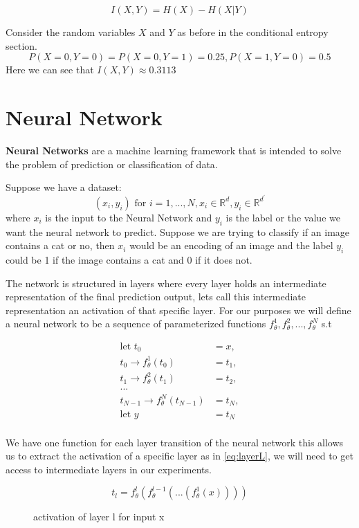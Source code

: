 \begin{equation}
  I(X, Y) = H(X) - H(X|Y)
\label{eq:miEntropy}
\end{equation}

Consider the random variables $X$ and $Y$ as before in the conditional entropy
section. 
$$P(X=0,Y=0) = P(X=0,Y=1) = 0.25, P(X=1,Y=0) = 0.5$$
Here we can see that $I(X,Y) \approx 0.3113$

\section{Neural Network}

\textbf{Neural Networks} are a machine learning framework that is intended to
solve the problem of prediction or classification of data. 

Suppose we have a dataset:
$$ (x_i, y_i) \text{ for } i = 1,...,N, x_i \in \mathbb{R}^d, y_i \in \mathbb{R}^{d^\prime}$$ 
where $x_i$ is the input to the Neural Network and $y_i$ is the label or the
value we want the neural network to predict. Suppose we are trying to classify
if an image contains a cat or no, then $x_i$ would be an encoding of an image
and the label $y_i$ could be 1 if the image contains a cat and 0 if it does not.

The network is structured in layers where every layer holds an intermediate
representation of the final prediction output, lets call this intermediate
representation an activation of that specific layer. For our purposes we will
define a neural network to be a sequence of parameterized functions
$f_{\theta}^1, f_{\theta}^2, ...  ,f_{\theta}^N$ s.t

\begin{align*}
  \text{let } t_0 &= x, \\
    t_0 \rightarrow f_{\theta}^1(t_0) &= t_1,\\
    t_1 \rightarrow f_{\theta}^2(t_1) &= t_2,\\
    ...\\
    t_{N-1} \rightarrow f_{\theta}^N(t_{N-1}) &= t_N,\\
    \text{let } y &= t_N\\
\end{align*}

We have one function for each layer transition of the neural network this allows
us to extract the activation of a specific layer as in \autoref{eq:layerL}, we
will need to get access to intermediate layers in our experiments.

\begin{figure}[H]
  \[ t_l = f_{\theta}^l(f_{\theta}^{l-1}(...(f_{\theta}^1(x)))) \]
  \caption{activation of layer l for input x}
  \label{eq:layerL}
\end{figure}

